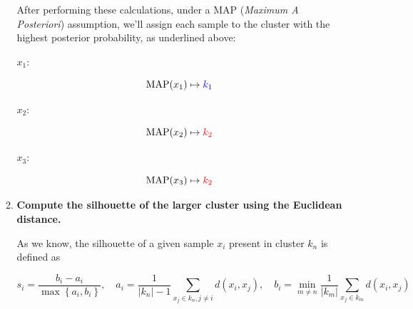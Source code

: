 \documentclass[12pt]{article}
\begin{document}
\begin{enumerate}[leftmargin=\labelsep]
\begin{enumerate}[leftmargin=\labelsep]
\begin{paracol}{3}
                \end{paracol}

                After performing these calculations, under a MAP (\emph{Maximum A Posteriori})
                assumption, we'll assign each sample to the cluster with the highest posterior
                probability, as underlined above:

                \begin{paracol}{3}
                  \setlength{\columnseprule}{1pt}
                  \def\columnseprulecolor{\color{black}}
                  \centering

                  $x_1$:

                  $$
                    \text{MAP}(x_1) \mapsto \textcolor{blue}{k_1}
                  $$

                  \switchcolumn

                  $x_2$:

                  $$
                    \text{MAP}(x_2) \mapsto \textcolor{red}{k_2}
                  $$

                  \switchcolumn

                  $x_3$:

                  $$
                    \text{MAP}(x_3) \mapsto \textcolor{red}{k_2}
                  $$

                \end{paracol}

                \pagebreak

          \item \textbf{Compute the silhouette of the larger cluster using the Euclidean distance.}

                As we know, the silhouette of a given sample $x_i$ present in cluster $k_n$ is defined as

                \begin{equation*}
                  s_i = \frac{b_i - a_i}{\max\left\{a_i, b_i\right\}}, \quad
                  a_i = \frac{1}{|k_n| - 1} \sum_{x_j \in k_n, j \neq i} d(x_i, x_j), \quad
                  b_i = \min_{m \neq n} \frac{1}{|k_m|} \sum_{x_j \in k_m} d(x_i, x_j)
                \end{equation*}


\end{enumerate}
\end{enumerate}
\end{document}
